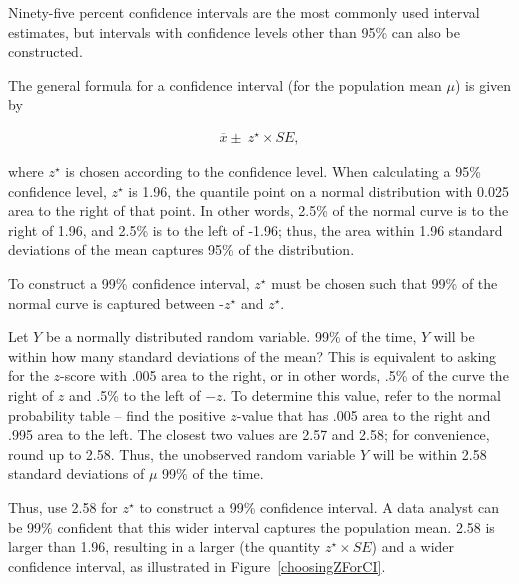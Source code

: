\begin{spacing}{1.5}
Ninety-five percent confidence intervals are the most commonly used interval estimates, but intervals with confidence levels other than 95\% can also be constructed.

The general formula for a confidence interval (for the population mean $\mu$) is given by 

\begin{align}
	\overline{x} \pm \ z^{\star} \times SE,
\end{align}

where $z^{\star}$ is chosen according to the confidence level. When calculating a 95\% confidence level, $z^{\star}$ is 1.96, the quantile point on a normal distribution with 0.025 area to the right of that point. In other words, 2.5\% of the normal curve is to the right of 1.96, and 2.5\% is to the left of -1.96; thus, the area within 1.96 standard deviations of the mean captures 95\% of the distribution.

To construct a 99\% confidence interval, $z^{\star}$ must be chosen such that 99\% of the normal curve is captured between -$z^{\star}$ and $z^{\star}$.

\begin{example}{Let $Y$ be a normally distributed random variable. 99\% of the time, $Y$ will be within how many standard deviations of the mean?}
	This is equivalent to asking for the $z$-score with .005 area to the right, or in other words, .5\% of the curve the right of $z$ and .5\% to the left of $-z$. To determine this value, refer to the normal probability table -- find the positive $z$-value that has .005 area to the right and .995 area to the left. The closest two values are 2.57 and 2.58; for convenience, round up to 2.58. Thus, the unobserved random variable $Y$ will be within 2.58 standard deviations of $\mu$ 99\% of the time.
\end{example}

Thus, use 2.58 for $z^{\star}$ to construct a 99\% confidence interval. A data analyst can be 99\% confident that this wider interval captures the population mean. 2.58 is larger than 1.96, resulting in a larger  (the quantity $z^{\star} \times SE$) and a wider confidence interval, as illustrated in Figure~\ref{choosingZForCI}.


\end{spacing}
